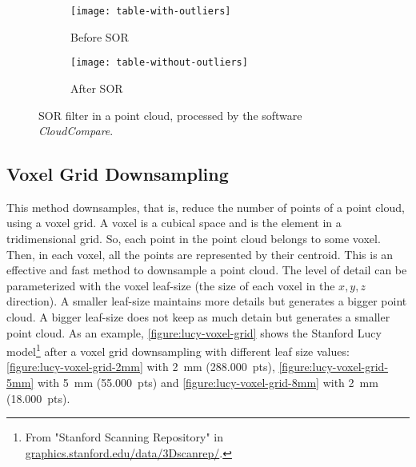 \begin{figure}[h]
    
    \centering
    \begin{subfigure}[t]{0.5\textwidth}
        
        \centering
        \texttt{[image: table-with-outliers]}
        \caption{Before SOR}
        \label{figure:sor-filter-before}
    \end{subfigure}%
    \begin{subfigure}[t]{0.5\textwidth}
        \centering
        \texttt{[image: table-without-outliers]}
        \caption{After SOR}
        \label{figure:sor-filter-after}
    \end{subfigure}

    \caption{SOR filter in a point cloud, processed by the software \textit{CloudCompare}.}
    \label{figure:sor-filter}
\end{figure}

\subsection{Voxel Grid Downsampling}

This method downsamples, that is, reduce the number of points of a point cloud, using a voxel grid. A voxel is a cubical space and is the element in a tridimensional grid. So, each point in the point cloud belongs to some voxel. Then, in each voxel, all the points are represented by their centroid. This is an effective and fast method to downsample a point cloud. The level of detail can be parameterized with the voxel leaf-size (the size of each voxel in the $x,y,z$ direction). A smaller leaf-size maintains more details but generates a bigger point cloud. A bigger leaf-size does not keep as much detain but generates a smaller point cloud. As an example, \cref{figure:lucy-voxel-grid} shows the Stanford Lucy model\footnote{From "Stanford Scanning Repository" in \url{graphics.stanford.edu/data/3Dscanrep/}.} after a voxel grid downsampling with different leaf size values: \cref{figure:lucy-voxel-grid-2mm} with \SI{2}{\milli\meter} (288.000~pts), \cref{figure:lucy-voxel-grid-5mm} with \SI{5}{\milli\meter} (55.000~pts) and \cref{figure:lucy-voxel-grid-8mm} with \SI{2}{\milli\meter} (18.000~pts).

